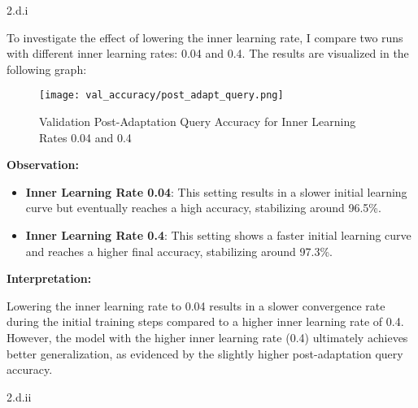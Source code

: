 
\clearpage

\LARGE
2.d.i
\normalsize

\begin{answer}
    To investigate the effect of lowering the inner learning rate, I compare two runs with different inner learning rates: 0.04 and 0.4. The results are visualized in the following graph:

\begin{figure}[H]
\centering
\texttt{[image: val\_accuracy/post\_adapt\_query.png]}
\caption{Validation Post-Adaptation Query Accuracy for Inner Learning Rates 0.04 and 0.4}
\end{figure}

\textbf{Observation:}

\begin{itemize}
  \item \textbf{Inner Learning Rate 0.04}: This setting results in a slower initial learning curve but eventually reaches a high accuracy, stabilizing around 96.5\%.
  \item \textbf{Inner Learning Rate 0.4}: This setting shows a faster initial learning curve and reaches a higher final accuracy, stabilizing around 97.3\%.
\end{itemize}

\textbf{Interpretation:}

Lowering the inner learning rate to 0.04 results in a slower convergence rate during the initial training steps compared to a higher inner learning rate of 0.4. However, the model with the higher inner learning rate (0.4) ultimately achieves better generalization, as evidenced by the slightly higher post-adaptation query accuracy.

\end{answer}


\LARGE
2.d.ii
\normalsize

